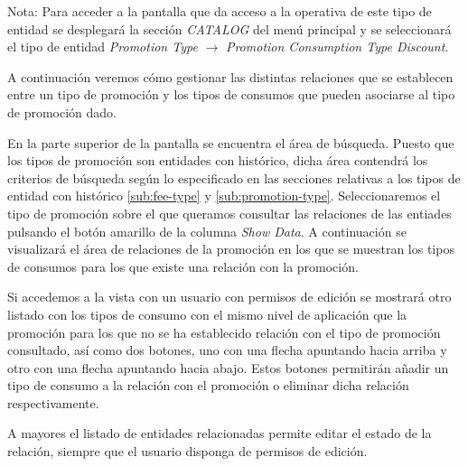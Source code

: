 Nota: Para acceder a la pantalla que da acceso a la operativa de este tipo de entidad se desplegará la sección \emph{CATALOG} del menú principal y se seleccionará el tipo de entidad \emph{Promotion Type} $\rightarrow$  \emph{Promotion Consumption Type Discount}.


A continuación veremos cómo gestionar las distintas relaciones que se establecen entre un tipo de promoción y los tipos de consumos que pueden asociarse al tipo de promoción dado.


En la parte superior de la pantalla se encuentra el área de búsqueda. Puesto que los tipos de promoción son entidades con histórico, dicha área contendrá los criterios de búsqueda según lo especificado en las secciones relativas a los tipos de entidad con histórico \ref{sub:fee-type} y \ref{sub:promotion-type}. 
Seleccionaremos el tipo de promoción sobre el que queramos consultar las relaciones de las entiades pulsando el botón amarillo de la columna \emph{Show Data}. A continuación se visualizará el área de relaciones de la promoción en los que se muestran los tipos de consumos para los que existe una relación con la promoción.


Si accedemos a la vista con un usuario con permisos de edición se mostrará otro listado con los tipos de consumo con el mismo nivel de aplicación que la promoción para los que no se ha establecido relación con el tipo de promoción consultado, así como dos botones, uno con una flecha apuntando hacia arriba y otro con una flecha apuntando hacia abajo. Estos botones permitirán añadir un tipo de consumo a la relación con el promoción o eliminar dicha relación respectivamente. 

A mayores el listado de entidades relacionadas permite editar el estado de la relación, siempre que el usuario disponga de permisos de edición.



